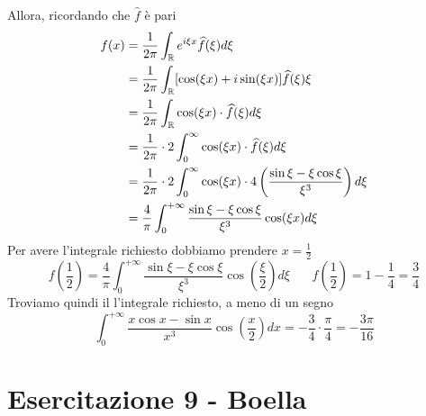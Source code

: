 Allora, ricordando che $\hat{f}$ è pari
\begin{align*}
f(x) & = \frac{1}{2\pi }\int _{\mathbb{R} } e^{i\xi x}\widehat{f}(\xi) d\xi \\
 & = \frac{1}{2\pi }\int _{\mathbb{R} }[\cos(\xi x) + i\sin(\xi x)]\widehat{f}(\xi) \xi \\
 & = \frac{1}{2\pi }\int _{\mathbb{R} }\cos(\xi x) \cdot \widehat{f}(\xi) d\xi \\
 & = \frac{1}{2\pi } \cdot 2\int ^{\infty }_{0}\cos(\xi x) \cdot \widehat{f}(\xi) d\xi \\
 & = \frac{1}{2\pi } \cdot 2\int ^{\infty }_{0}\cos(\xi x) \cdot 4\left(\frac{\sin \xi - \xi \cos \xi }{\xi ^{3}}\right) d\xi \\
 & = \frac{4}{\pi }\int ^{ + \infty }_{0}\frac{\sin \xi - \xi \cos \xi }{\xi ^{3}}\cos(\xi x) d\xi 
\end{align*}
Per avere l'integrale richiesto dobbiamo prendere $x = \frac{1}{2}$
\begin{equation*}
f\left(\frac{1}{2}\right) = \frac{4}{\pi }\int ^{ + \infty }_{0}\frac{\sin \xi - \xi \cos \xi }{\xi ^{3}}\cos\left(\frac{\xi }{2}\right) d\xi \ \ \ \ \ \ \ \ f\left(\frac{1}{2}\right) = 1 - \frac{1}{4} = \frac{3}{4}
\end{equation*}
Troviamo quindi il l'integrale richiesto, a meno di un segno
\begin{equation*}
\int ^{ + \infty }_{0}\frac{x\cos x - \sin x}{x^{3}}\cos\left(\frac{x}{2}\right) dx = -\frac{3}{4} \cdot \frac{\pi }{4} = - \frac{3\pi }{16}
\end{equation*}
\chapter{Esercitazione 9 - Boella}
\ParteEsercizi

